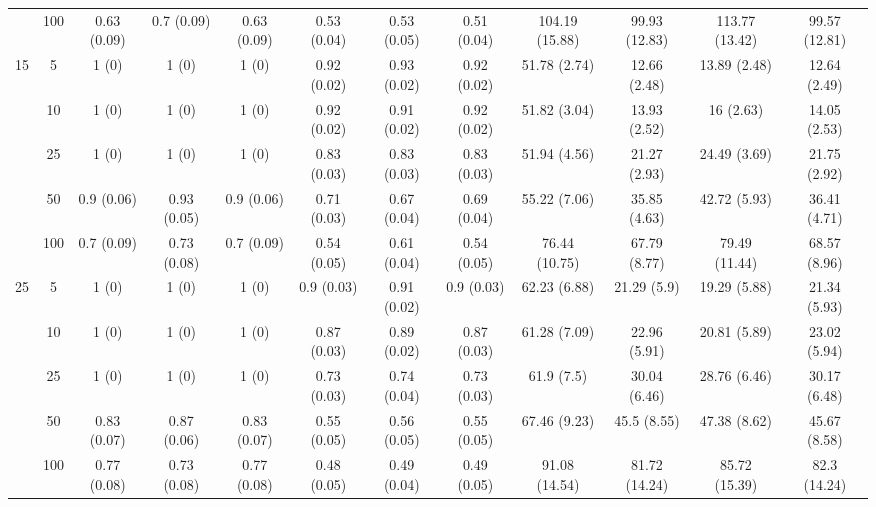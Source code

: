 \documentclass[11pt]{article}
\theoremstyle{definition}
\begin{document}
\begin{table}[h]
\begin{center}
{\begin{tabular}{cc|ccc|ccc|cccc|}
    & 100  & 0.63 (0.09) & 0.7 (0.09) & 0.63 (0.09) & 0.53 (0.04) & 0.53 (0.05) & 0.51 (0.04) & 104.19 (15.88) & 99.93 (12.83) & 113.77 (13.42) & 99.57 (12.81) \\[.3cm]  
   \multirow{5}{*}{15}  & 5  & 1 (0) & 1 (0) & 1 (0) & 0.92 (0.02) & 0.93 (0.02) & 0.92 (0.02) & 51.78 (2.74) & 12.66 (2.48) & 13.89 (2.48) & 12.64 (2.49) \\ 
    & 10  & 1 (0) & 1 (0) & 1 (0) & 0.92 (0.02) & 0.91 (0.02) & 0.92 (0.02) & 51.82 (3.04) & 13.93 (2.52) & 16 (2.63) & 14.05 (2.53) \\ 
    & 25  & 1 (0) & 1 (0) & 1 (0) & 0.83 (0.03) & 0.83 (0.03) & 0.83 (0.03) & 51.94 (4.56) & 21.27 (2.93) & 24.49 (3.69) & 21.75 (2.92) \\ 
    & 50  & 0.9 (0.06) & 0.93 (0.05) & 0.9 (0.06) & 0.71 (0.03) & 0.67 (0.04) & 0.69 (0.04) & 55.22 (7.06) & 35.85 (4.63) & 42.72 (5.93) & 36.41 (4.71) \\ 
    & 100  & 0.7 (0.09) & 0.73 (0.08) & 0.7 (0.09) & 0.54 (0.05) & 0.61 (0.04) & 0.54 (0.05) & 76.44 (10.75) & 67.79 (8.77) & 79.49 (11.44) & 68.57 (8.96) \\[.3cm]  
   \multirow{5}{*}{25}  & 5  & 1 (0) & 1 (0) & 1 (0) & 0.9 (0.03) & 0.91 (0.02) & 0.9 (0.03) & 62.23 (6.88) & 21.29 (5.9) & 19.29 (5.88) & 21.34 (5.93) \\ 
    & 10  & 1 (0) & 1 (0) & 1 (0) & 0.87 (0.03) & 0.89 (0.02) & 0.87 (0.03) & 61.28 (7.09) & 22.96 (5.91) & 20.81 (5.89) & 23.02 (5.94) \\ 
    & 25  & 1 (0) & 1 (0) & 1 (0) & 0.73 (0.03) & 0.74 (0.04) & 0.73 (0.03) & 61.9 (7.5) & 30.04 (6.46) & 28.76 (6.46) & 30.17 (6.48) \\ 
    & 50  & 0.83 (0.07) & 0.87 (0.06) & 0.83 (0.07) & 0.55 (0.05) & 0.56 (0.05) & 0.55 (0.05) & 67.46 (9.23) & 45.5 (8.55) & 47.38 (8.62) & 45.67 (8.58) \\ 
    & 100  & 0.77 (0.08) & 0.73 (0.08) & 0.77 (0.08) & 0.48 (0.05) & 0.49 (0.04) & 0.49 (0.05) & 91.08 (14.54) & 81.72 (14.24) & 85.72 (15.39) & 82.3 (14.24) \\ 
\end{tabular}}
   \end{center}
      \vspace{-.5cm}
\end{table}
\end{document}

